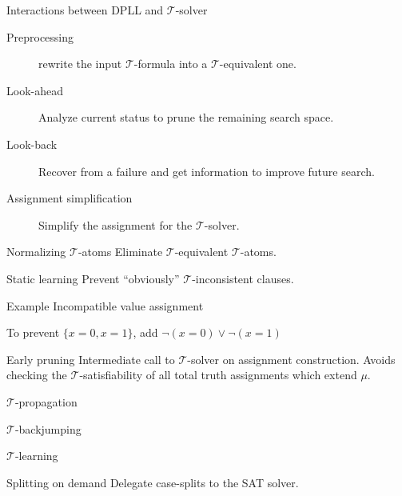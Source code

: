 \documentclass{beamer}
\begin{document}
\begin{frame}{Interactions between DPLL and $\mathcal{T}$-solver}
  \begin{description}
    \item[Preprocessing] rewrite the input $\mathcal{T}$-formula into a $\mathcal{T}$-equivalent one.
    \item[Look-ahead] Analyze current status to prune the remaining search space.
    \item[Look-back] Recover from a failure and get information to improve future search.
    \item[Assignment simplification] Simplify the assignment for the $\mathcal{T}$-solver.
  \end{description}
\end{frame}

\begin{frame}{Normalizing $\mathcal{T}$-atoms}
  Eliminate $\mathcal{T}$-equivalent $\mathcal{T}$-atoms.
\end{frame}

\begin{frame}{Static learning}
  Prevent ``obviously'' $\mathcal{T}$-inconsistent clauses.

  \begin{exampleblock}{Example}
    Incompatible value assignment

    To prevent $\{x=0, x=1\}$, add $\neg (x=0) \lor \neg (x=1)$
  \end{exampleblock}
\end{frame}

\begin{frame}{Early pruning}
  Intermediate call to $\mathcal{T}$-solver on assignment construction.
  Avoids checking the $\mathcal{T}$-satisfiability of all total truth assignments which extend $\mu$.
\end{frame}

\begin{frame}{$\mathcal{T}$-propagation}
\end{frame}

\begin{frame}{$\mathcal{T}$-backjumping}
\end{frame}

\begin{frame}{$\mathcal{T}$-learning}
\end{frame}

\begin{frame}{Splitting on demand}
  Delegate case-splits to the SAT solver.
\end{frame}
\end{document}
